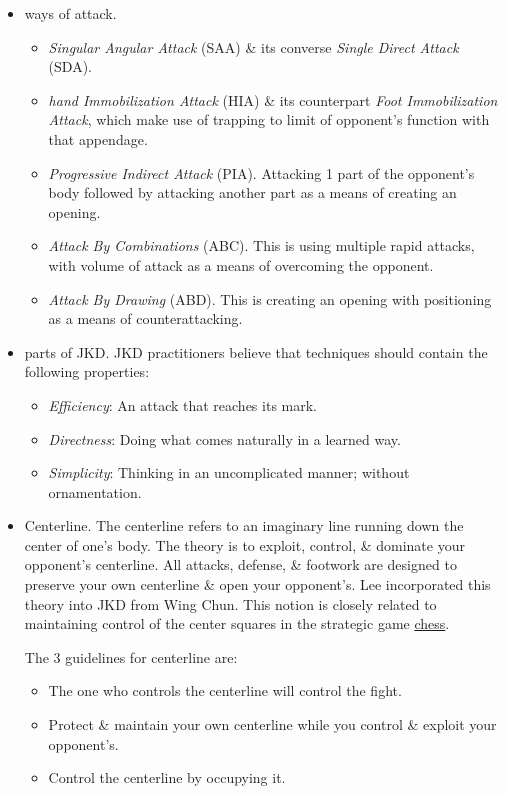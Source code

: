 \documentclass{article}
\begin{document}
\begin{itemize}
	\item { ways of attack.}
	\begin{itemize}
		\item {\it Singular Angular Attack} (SAA) \& its converse {\it Single Direct Attack} (SDA).
		\item {\it hand Immobilization Attack} (HIA) \& its counterpart {\it Foot Immobilization Attack}, which make use of trapping to limit of opponent's function with that appendage.
		\item {\it Progressive Indirect Attack} (PIA). Attacking 1 part of the opponent's body followed by attacking another part as a means of creating an opening.
		\item {\it Attack By Combinations} (ABC). This is using multiple rapid attacks, with volume of attack as a means of overcoming the opponent.
		\item {\it Attack By Drawing} (ABD). This is creating an opening with positioning as a means of counterattacking.
	\end{itemize}
	\item { parts of JKD.} JKD practitioners believe that techniques should contain the following properties:
	\begin{itemize}
		\item {\it Efficiency}: An attack that reaches its mark.
		\item {\it Directness}: Doing what comes naturally in a learned way.
		\item {\it Simplicity}: Thinking in an uncomplicated manner; without ornamentation.
	\end{itemize}
	\item {\sf Centerline.} The centerline refers to an imaginary line running down the center of one's body. The theory is to exploit, control, \& dominate your opponent's centerline. All attacks, defense, \& footwork are designed to preserve your own centerline \& open your opponent's. {\sc Lee} incorporated this theory into JKD from Wing Chun. This notion is closely related to maintaining control of the center squares in the strategic game \href{https://en.wikipedia.org/wiki/Chess}{chess}.
	
	The 3 guidelines for centerline are:
	\begin{itemize}
		\item The one who controls the centerline will control the fight.
		\item Protect \& maintain your own centerline while you control \& exploit your opponent's.
		\item Control the centerline by occupying it.
	\end{itemize}
\end{itemize}
\end{document}
